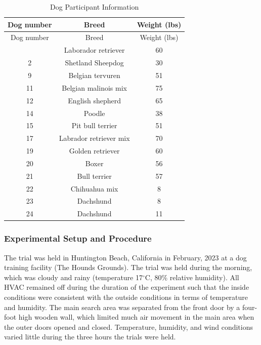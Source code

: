 \documentclass[
]{article}
\begin{document}
\begin{longtable}[]{@{}ccc@{}}
\caption{\label{tab:breed-table}Dog Participant Information}\tabularnewline
\toprule\noalign{}
Dog number & Breed & Weight (lbs) \\
\midrule\noalign{}
\endfirsthead
\toprule\noalign{}
Dog number & Breed & Weight (lbs) \\
\midrule\noalign{}
\endhead
\bottomrule\noalign{}
\endlastfoot
1 & Laborador retriever & 60 \\
2 & Shetland Sheepdog & 30 \\
9 & Belgian tervuren & 51 \\
11 & Belgian malinois mix & 75 \\
12 & English shepherd & 65 \\
14 & Poodle & 38 \\
15 & Pit bull terrier & 51 \\
17 & Labrador retriever mix & 70 \\
19 & Golden retriever & 60 \\
20 & Boxer & 56 \\
21 & Bull terrier & 57 \\
22 & Chihuahua mix & 8 \\
23 & Dachshund & 8 \\
24 & Dachshund & 11 \\
\end{longtable}

\hypertarget{experimental-setup-and-procedure}{%
\subsubsection{Experimental Setup and Procedure}\label{experimental-setup-and-procedure}}

The trial was held in Huntington Beach, California in February, 2023 at a dog training facility (The Hounds Grounds). The trial was held during the morning, which was cloudy and rainy (temperature 17\(^{\circ}\)C, 80\% relative humidity). All HVAC remained off during the duration of the experiment such that the inside conditions were consistent with the outside conditions in terms of temperature and humidity. The main search area was separated from the front door by a four-foot high wooden wall, which limited much air movement in the main area when the outer doors opened and closed. Temperature, humidity, and wind conditions varied little during the three hours the trials were held.
\end{document}
